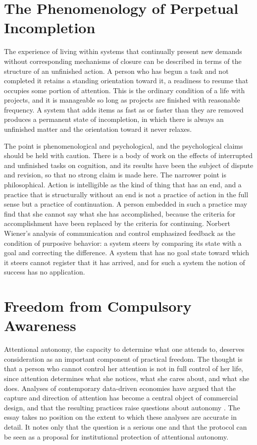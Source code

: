 \documentclass[11pt]{report}
\theoremstyle{definition}
\theoremstyle{remark}
\begin{document}
\section{The Phenomenology of Perpetual Incompletion}

The experience of living within systems that continually present new demands without corresponding mechanisms of closure can be described in terms of the structure of an unfinished action. A person who has begun a task and not completed it retains a standing orientation toward it, a readiness to resume that occupies some portion of attention. This is the ordinary condition of a life with projects, and it is manageable so long as projects are finished with reasonable frequency. A system that adds items as fast as or faster than they are removed produces a permanent state of incompletion, in which there is always an unfinished matter and the orientation toward it never relaxes.

The point is phenomenological and psychological, and the psychological claims should be held with caution. There is a body of work on the effects of interrupted and unfinished tasks on cognition, and its results have been the subject of dispute and revision, so that no strong claim is made here. The narrower point is philosophical. Action is intelligible as the kind of thing that has an end, and a practice that is structurally without an end is not a practice of action in the full sense but a practice of continuation. A person embedded in such a practice may find that she cannot say what she has accomplished, because the criteria for accomplishment have been replaced by the criteria for continuing. Norbert Wiener's analysis of communication and control \cite{wiener} emphasized feedback as the condition of purposive behavior: a system steers by comparing its state with a goal and correcting the difference. A system that has no goal state toward which it steers cannot register that it has arrived, and for such a system the notion of success has no application.

\section{Freedom from Compulsory Awareness}

Attentional autonomy, the capacity to determine what one attends to, deserves consideration as an important component of practical freedom. The thought is that a person who cannot control her attention is not in full control of her life, since attention determines what she notices, what she cares about, and what she does. Analyses of contemporary data-driven economies have argued that the capture and direction of attention has become a central object of commercial design, and that the resulting practices raise questions about autonomy \cite{zuboff}. The essay takes no position on the extent to which these analyses are accurate in detail. It notes only that the question is a serious one and that the protocol can be seen as a proposal for institutional protection of attentional autonomy.
\end{document}
